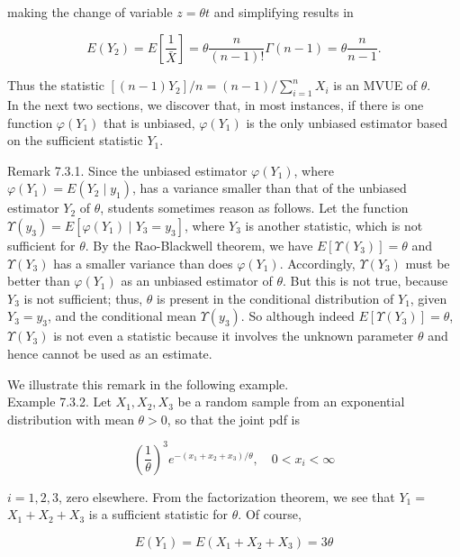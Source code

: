 making the change of variable $z=\theta t$ and simplifying results in

$$
E\left(Y_{2}\right)=E\left[\frac{1}{\bar{X}}\right]=\theta \frac{n}{(n-1)!} \Gamma(n-1)=\theta \frac{n}{n-1} .
$$

Thus the statistic $\left[(n-1) Y_{2}\right] / n=(n-1) / \sum_{i=1}^{n} X_{i}$ is an MVUE of $\theta$.\\
In the next two sections, we discover that, in most instances, if there is one function $\varphi\left(Y_{1}\right)$ that is unbiased, $\varphi\left(Y_{1}\right)$ is the only unbiased estimator based on the sufficient statistic $Y_{1}$.

Remark 7.3.1. Since the unbiased estimator $\varphi\left(Y_{1}\right)$, where $\varphi\left(Y_{1}\right)=E\left(Y_{2} \mid y_{1}\right)$, has a variance smaller than that of the unbiased estimator $Y_{2}$ of $\theta$, students sometimes reason as follows. Let the function $\Upsilon\left(y_{3}\right)=E\left[\varphi\left(Y_{1}\right) \mid Y_{3}=y_{3}\right]$, where $Y_{3}$ is another statistic, which is not sufficient for $\theta$. By the Rao-Blackwell theorem, we have $E\left[\Upsilon\left(Y_{3}\right)\right]=\theta$ and $\Upsilon\left(Y_{3}\right)$ has a smaller variance than does $\varphi\left(Y_{1}\right)$. Accordingly, $\Upsilon\left(Y_{3}\right)$ must be better than $\varphi\left(Y_{1}\right)$ as an unbiased estimator of $\theta$. But this is not true, because $Y_{3}$ is not sufficient; thus, $\theta$ is present in the conditional distribution of $Y_{1}$, given $Y_{3}=y_{3}$, and the conditional mean $\Upsilon\left(y_{3}\right)$. So although indeed $E\left[\Upsilon\left(Y_{3}\right)\right]=\theta$, $\Upsilon\left(Y_{3}\right)$ is not even a statistic because it involves the unknown parameter $\theta$ and hence cannot be used as an estimate.

We illustrate this remark in the following example.\\
Example 7.3.2. Let $X_{1}, X_{2}, X_{3}$ be a random sample from an exponential distribution with mean $\theta>0$, so that the joint pdf is

$$
\left(\frac{1}{\theta}\right)^{3} e^{-\left(x_{1}+x_{2}+x_{3}\right) / \theta}, \quad 0<x_{i}<\infty
$$

$i=1,2,3$, zero elsewhere. From the factorization theorem, we see that $Y_{1}=$ $X_{1}+X_{2}+X_{3}$ is a sufficient statistic for $\theta$. Of course,

$$
E\left(Y_{1}\right)=E\left(X_{1}+X_{2}+X_{3}\right)=3 \theta
$$

